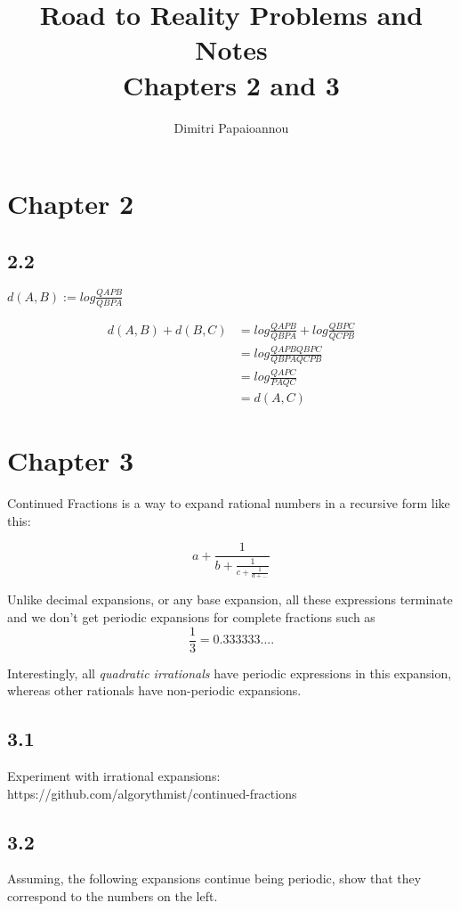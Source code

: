 \documentclass[]{article}
\title{Road to Reality Problems and Notes\\Chapters 2 and 3}
\author{Dimitri Papaioannou}
\begin{document}
\maketitle

\section*{Chapter 2}

\subsection*{2.2}

$d(A,B) := log\frac{QA PB}{QB PA}$ 

\begin{eqnarray}
d(A,B)+d(B,C) &= log\frac{QA PB}{QB PA} + log\frac{QB PC}{QC PB}\\
&= log\frac{QA PB QB PC}{QB PA QC PB}\\
&= log\frac{QA PC}{PA QC}\\
&= d(A,C)
\end{eqnarray}


\section*{Chapter 3}
Continued Fractions is a way to expand rational numbers in a recursive form like this:

\begin{equation}
	a+\frac{1}{b+\frac{1}{c+\frac{1}{d+...}}}
\end{equation}

Unlike decimal expansions, or any base expansion, all these expressions terminate and we don't get periodic expansions for complete fractions such as
$$ \frac{1}{3} = 0.333333.... $$

Interestingly, all \textit{quadratic irrationals} have periodic expressions in this expansion, whereas other rationals have non-periodic expansions.

\subsection*{3.1}
Experiment with irrational expansions: 
https://github.com/algorythmist/continued-fractions


\subsection*{3.2}
Assuming, the following expansions continue being periodic, show that they correspond to the numbers on the left.
\end{document}
